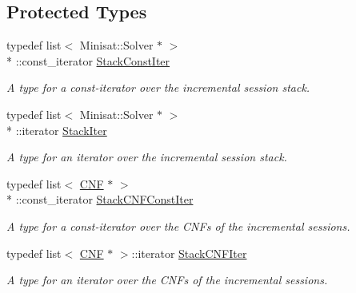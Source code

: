 \subsection*{Protected Types}
\begin{DoxyCompactItemize}
\item 
typedef list$<$ Minisat\-::\-Solver $\ast$ $>$\\*
\-::const\-\_\-iterator \hyperlink{classMiniSatApi_aa4c233a841e489de9a59622e18df4678}{Stack\-Const\-Iter}
\begin{DoxyCompactList}\small\item\em A type for a const-\/iterator over the incremental session stack. \end{DoxyCompactList}\item 
typedef list$<$ Minisat\-::\-Solver $\ast$ $>$\\*
\-::iterator \hyperlink{classMiniSatApi_a46469116348b199bae1b92d209b969c0}{Stack\-Iter}
\begin{DoxyCompactList}\small\item\em A type for an iterator over the incremental session stack. \end{DoxyCompactList}\item 
typedef list$<$ \hyperlink{classCNF}{C\-N\-F} $\ast$ $>$\\*
\-::const\-\_\-iterator \hyperlink{classMiniSatApi_a1d7b9074d64167fb10552e58a9a84ddb}{Stack\-C\-N\-F\-Const\-Iter}
\begin{DoxyCompactList}\small\item\em A type for a const-\/iterator over the C\-N\-Fs of the incremental sessions. \end{DoxyCompactList}\item 
typedef list$<$ \hyperlink{classCNF}{C\-N\-F} $\ast$ $>$\-::iterator \hyperlink{classMiniSatApi_a12ef23c063731cbdb7405de0e670f6a7}{Stack\-C\-N\-F\-Iter}
\begin{DoxyCompactList}\small\item\em A type for an iterator over the C\-N\-Fs of the incremental sessions. \end{DoxyCompactList}\end{DoxyCompactItemize}
